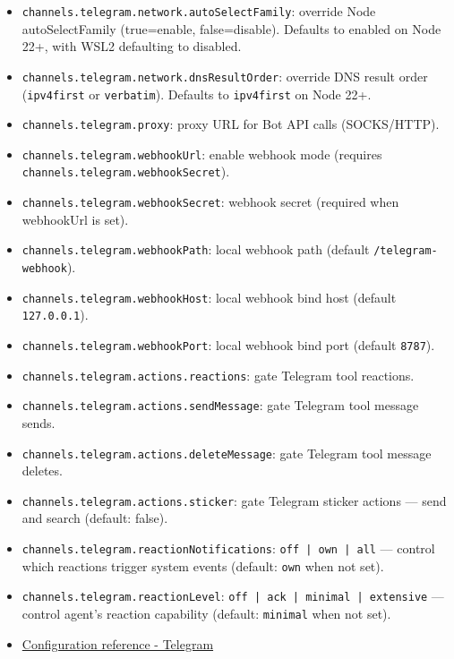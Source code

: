 \begin{itemize}
  \item \texttt{channels.telegram.network.autoSelectFamily}: override Node autoSelectFamily (true=enable, false=disable). Defaults to enabled on Node 22+, with WSL2 defaulting to disabled.
  \item \texttt{channels.telegram.network.dnsResultOrder}: override DNS result order (\texttt{ipv4first} or \texttt{verbatim}). Defaults to \texttt{ipv4first} on Node 22+.
  \item \texttt{channels.telegram.proxy}: proxy URL for Bot API calls (SOCKS/HTTP).
  \item \texttt{channels.telegram.webhookUrl}: enable webhook mode (requires \texttt{channels.telegram.webhookSecret}).
  \item \texttt{channels.telegram.webhookSecret}: webhook secret (required when webhookUrl is set).
  \item \texttt{channels.telegram.webhookPath}: local webhook path (default \texttt{/telegram-webhook}).
  \item \texttt{channels.telegram.webhookHost}: local webhook bind host (default \texttt{127.0.0.1}).
  \item \texttt{channels.telegram.webhookPort}: local webhook bind port (default \texttt{8787}).
  \item \texttt{channels.telegram.actions.reactions}: gate Telegram tool reactions.
  \item \texttt{channels.telegram.actions.sendMessage}: gate Telegram tool message sends.
  \item \texttt{channels.telegram.actions.deleteMessage}: gate Telegram tool message deletes.
  \item \texttt{channels.telegram.actions.sticker}: gate Telegram sticker actions — send and search (default: false).
  \item \texttt{channels.telegram.reactionNotifications}: \texttt{off | own | all} — control which reactions trigger system events (default: \texttt{own} when not set).
  \item \texttt{channels.telegram.reactionLevel}: \texttt{off | ack | minimal | extensive} — control agent's reaction capability (default: \texttt{minimal} when not set).
\end{itemize}


\begin{itemize}
  \item \href{/gateway/configuration-reference\#telegram}{Configuration reference - Telegram}
\end{itemize}


